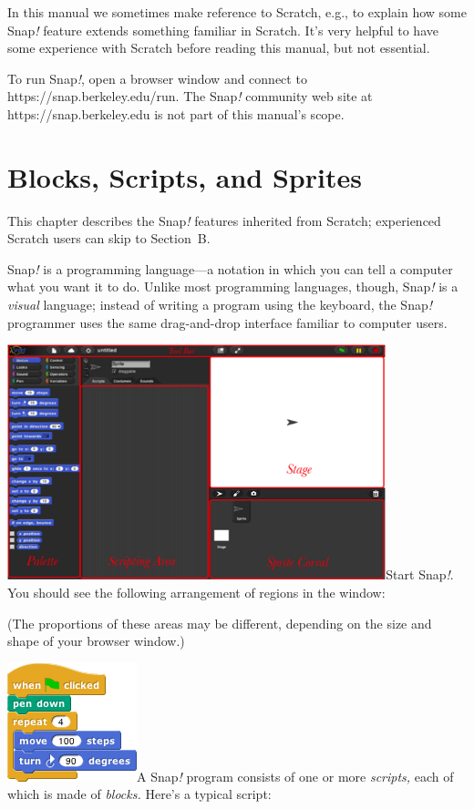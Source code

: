 In this manual we sometimes make reference to Scratch, e.g., to explain
how some Snap\emph{!} feature extends something familiar in Scratch.
It's very helpful to have some experience with Scratch before reading
this manual, but not essential.

To run Snap\emph{!}\textsc{,} open a browser window and connect to
https://snap.berkeley.edu/run. The Snap\emph{!} community web site at
https://snap.berkeley.edu is not part of this manual's scope.

\section{Blocks, Scripts, and Sprites}\label{blocks-scripts-and-sprites}

This chapter describes the Snap\emph{!} features inherited from Scratch;
experienced Scratch users can skip to Section~B.

Snap\emph{!} is a programming language---a notation in which you can
tell a computer what you want it to do. Unlike most programming
languages, though, Snap\emph{!} is a \emph{visual} language; instead of
writing a program using the keyboard, the Snap\emph{!} programmer uses
the same drag-and-drop interface familiar to computer users.

\includegraphics[width=4.32639in,height=2.68958in]{media/image5.png}Start
Snap\emph{!}\textsc{.} You should see the following arrangement of
regions in the window:

(The proportions of these areas may be different, depending on the size
and shape of your browser window.)

\includegraphics[width=1.47917in,height=1.35417in]{media/image6.png}A
Snap\emph{!} program consists of one or more \emph{scripts,} each of
which is made of \emph{blocks.} Here's a typical script:

